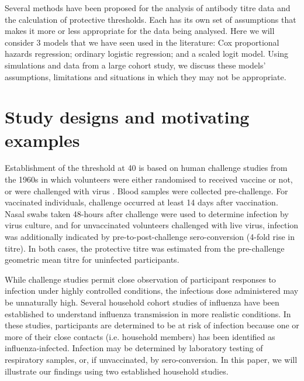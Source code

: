 \documentclass[12pt]{article}
\begin{document}

Several methods have been proposed for the analysis of antibody titre data and the calculation of protective thresholds. Each has its own set of assumptions that makes it more or less appropriate for the data being analysed. Here we will consider 3 models that we have seen used in the literature: Cox proportional hazards regression; ordinary logistic regression; and a scaled logit model. Using simulations and data from a large cohort study, we discuss these models' assumptions, limitations and situations in which they may not be appropriate.

\section{Study designs and motivating examples}

Establishment of the threshold at 40 is based on human challenge studies from the 1960s in which volunteers were either randomised to received vaccine or not, or were challenged with virus \citep{Hobson;1972}. Blood samples were collected pre-challenge. For vaccinated individuals, challenge occurred at least 14 days after vaccination. Nasal swabs taken 48-hours after challenge were used to determine infection by virus culture, and for unvaccinated volunteers challenged with live virus, infection was additionally indicated by pre-to-post-challenge sero-conversion (4-fold rise in titre). In both cases, the protective titre was estimated from the pre-challenge geometric mean titre for uninfected participants. 

While challenge studies permit close observation of participant responses to infection under highly controlled conditions, the infectious dose administered may be unnaturally high. Several household cohort studies of influenza have been established to understand influenza transmission in more realistic conditions. In these studies, participants are determined to be at risk of infection because one or more of their close contacts (i.e. household members) has been identified as influenza-infected.  Infection may be determined by laboratory testing of respiratory samples, or, if unvaccinated, by sero-conversion. In this paper, we will illustrate our findings using two established household studies. 
\end{document}
